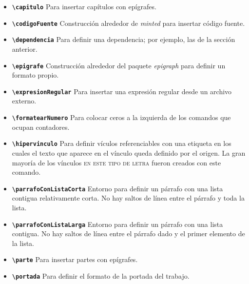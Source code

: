 \begin{itemize}

  \item \textbf{\texttt{{\textbackslash}capitulo}}
    Para insertar capítulos con epígrafes.

  \item \textbf{\texttt{{\textbackslash}codigoFuente}}
    Construcción alrededor de \textit{minted} para insertar código fuente.

  \item \textbf{\texttt{{\textbackslash}dependencia}}
    Para definir una dependencia; por ejemplo, las de la sección anterior.

  \item \textbf{\texttt{{\textbackslash}epigrafe}}
    Construcción alrededor del paquete \textit{epigraph} para definir un
    formato propio.

  \item \textbf{\texttt{{\textbackslash}expresionRegular}}
    Para insertar una expresión regular desde un archivo externo.

  \item \textbf{\texttt{{\textbackslash}formatearNumero}}
    Para colocar ceros a la izquierda de los comandos que ocupan contadores.

  \item \textbf{\texttt{{\textbackslash}hipervinculo}}
    Para definir vículos referenciables con una etiqueta en los cuales el
    texto que aparece en el vínculo queda definido por el origen. La gran
    mayoría de los vínculos \textsc{en este tipo de letra} fueron creados
    con este comando.

  \item \textbf{\texttt{{\textbackslash}parrafoConListaCorta}}
    Entorno para definir un párrafo con una lista contigua relativamente corta.
    No hay saltos de línea entre el párrafo y toda la lista.

  \item \textbf{\texttt{{\textbackslash}parrafoConListaLarga}}
    Entorno para definir un párrafo con una lista contigua. No hay saltos de
    línea entre el párrafo dado y el primer elemento de la lista.

  \item \textbf{\texttt{{\textbackslash}parte}}
    Para insertar partes con epígrafes.

  \item \textbf{\texttt{{\textbackslash}portada}}
    Para definir el formato de la portada del trabajo.


\end{itemize}

